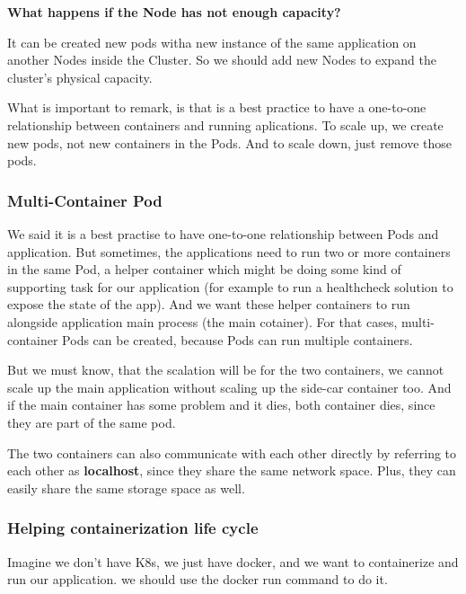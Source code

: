\documentclass{article}
\newenvironment{blocktemplate}[1]{%
    \tcolorbox[beamer,%
    noparskip,breakable,
    colframe=Blue,%
    colbacklower=LimeGreen!75!LightGreen,%
    title=#1]}%
    {\endtcolorbox}
\newenvironment{blocktemplateII}[1]{%
    \tcolorbox[beamer,%
    noparskip,breakable,
    colframe=Green,%
    colbacklower=LimeGreen!75!LightGreen,%
    title=#1]}%
    {\endtcolorbox}
\begin{document}
\textbf{What happens if the Node has not enough capacity?}

It can be created new pods witha new instance of the same application on another Nodes inside the Cluster. So we should add new Nodes to expand the cluster's physical capacity.

\begin{blocktemplate}{Note}
What is important to remark, is that is a best practice to have a one-to-one relationship between containers and running aplications. To scale up, we create new pods, not new containers in the Pods. And to scale down, just remove those pods.
\end{blocktemplate}


\subsubsection{Multi-Container Pod}

We said it is a best practise to have one-to-one relationship between Pods and application. But sometimes, the applications need to run two or more containers in the same Pod, a helper container which might be doing some kind of supporting task for our application (for example to run a healthcheck solution to expose the state of the app). And we want these helper containers to run alongside application main process (the main cotainer). For that cases, multi-container Pods can be created, because Pods can run multiple containers.

But we must know, that the scalation will be for the two containers, we cannot scale up the main application without scaling up the side-car container too. And if the main container has some problem and it dies, both container dies, since they are part of the same pod.

\begin{blocktemplateII}{Note}
The two containers can also communicate with each other directly by referring to each other as \textbf{localhost}, since they share the same network space. Plus, they can easily share the same storage space as well.    
\end{blocktemplateII}

\subsubsection{Helping containerization life cycle}

Imagine we don't have K8s, we just have docker, and we want to containerize and run our application. we should use the docker run command to do it.
\end{document}
